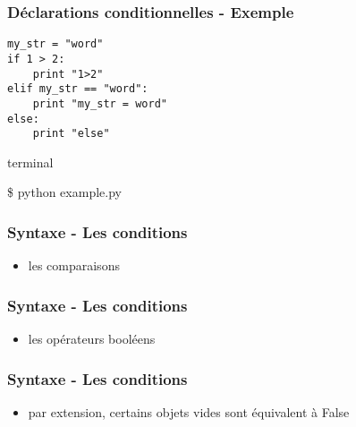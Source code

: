 \begin{frame}[fragile]
  \frametitle{Déclarations conditionnelles - Exemple}
  \begin{lstlisting}
my_str = "word"
if 1 > 2:
    print "1>2"
elif my_str == "word":
    print "my_str = word"
else:
    print "else"
  \end{lstlisting}

  \begin{beamercolorbox}{terminal}
  \begin{semiverbatim}
 \$ python example.py
  \end{semiverbatim}
  \end{beamercolorbox}

\end{frame}

\begin{frame}[fragile]
  \frametitle{Syntaxe - Les conditions}
  \begin{itemize}
    \item les comparaisons
  \end{itemize}
  \begin{ipython}
  \end{ipython}
\end{frame}

\begin{frame}[fragile]
  \frametitle{Syntaxe - Les conditions}
  \begin{itemize}
    \item les opérateurs booléens
  \end{itemize}
  \begin{ipython}
  \end{ipython}
\end{frame}

\begin{frame}[fragile]
  \frametitle{Syntaxe - Les conditions}
  \begin{itemize}
    \item par extension, certains objets vides sont équivalent à False
  \end{itemize}
  \begin{ipython}
  \end{ipython}
\end{frame}

